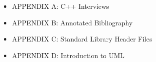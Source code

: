 \begin{itemize}
\item
APPENDIX A: C++ Interviews

\item
APPENDIX B: Annotated Bibliography

\item
APPENDIX C: Standard Library Header Files

\item
 APPENDIX D: Introduction to UML
\end{itemize}
